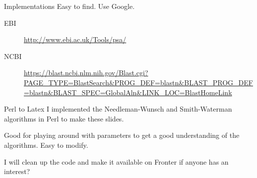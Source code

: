 \documentclass[pdf]{beamer}
\begin{document}
\begin{frame}{Implementations}
  Easy to find. Use Google.
  \begin{description}
  \item[EBI] \url{http://www.ebi.ac.uk/Tools/psa/}
  \item[NCBI]
    \url{https://blast.ncbi.nlm.nih.gov/Blast.cgi?PAGE_TYPE=BlastSearch\&PROG_DEF=blastn\&BLAST_PROG_DEF=blastn\&BLAST_SPEC=GlobalAln&LINK_LOC=BlastHomeLink}
  \end{description}
\end{frame}

\begin{frame}{Perl to Latex}
  I implemented the Needleman-Wunsch and Smith-Waterman algorithms in Perl to make
  these slides.

  Good for playing around with parameters to get a good understanding
  of the algorithms. Easy to modify.

  I will clean up the code and make it available on Fronter if anyone has an interest?
\end{frame}
\end{document}
